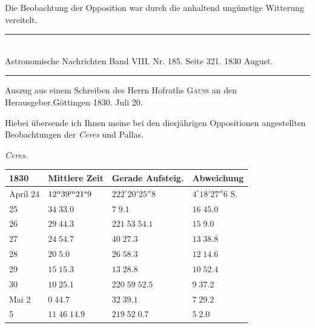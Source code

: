 Die Beobachtung der Opposition war durch die anhaltend ungünstige Witterung vereitelt.

\clearpage
{}
\hypertarget{native-467-letter}{}
\begin{center}
\rule{0.55\linewidth}{0.4pt}\\[2pt]
Astronomische Nachrichten Band VIII. Nr. 185. Seite 321. 1830 August.\\[2pt]
\rule{0.55\linewidth}{0.4pt}
\end{center}

\begin{center}Auszug aus einem Schreiben des Herrn Hofraths \textsc{Gauss} an den Herausgeber.\quad Göttingen 1830. Juli 20.\end{center}

Hiebei übersende ich Ihnen meine bei den diesjährigen Oppositionen angestellten Beobachtungen der \emph{Ceres} und Pallas.

\begin{center}
\emph{Ceres.}

\begin{tabular}{l|l|l|l}
1830 & Mittlere Zeit & Gerade Aufsteig. & Abweichung \\
\hline
April 24 & $12^{\rm u}39^{\rm m}21^{\rm s}9$ & $222^\circ20'25''8$ & $4^\circ18'27''6$ S. \\
\hfill 25 & $34\;33.0$ & $7\;9.1$ & $16\;45.0$ \\
\hfill 26 & $29\;44.3$ & $221\;53\;54.1$ & $15\;9.0$ \\
\hfill 27 & $24\;54.7$ & $40\;27.3$ & $13\;38.8$ \\
\hfill 28 & $20\;5.0$ & $26\;58.3$ & $12\;14.6$ \\
\hfill 29 & $15\;15.3$ & $13\;28.8$ & $10\;52.4$ \\
\hfill 30 & $10\;25.1$ & $220\;59\;52.5$ & $9\;37.2$ \\
Mai 2 & $0\;44.7$ & $32\;39.1$ & $7\;29.2$ \\
\hfill 5 & $11\;46\;14.9$ & $219\;52\;0.7$ & $5\;2.0$ \\
\end{tabular}
\end{center}

